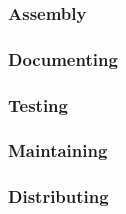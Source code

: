 \subsubsection{Assembly}
\subsubsection{Documenting}
\subsubsection{Testing}
\subsubsection{Maintaining}
\subsubsection{Distributing}


